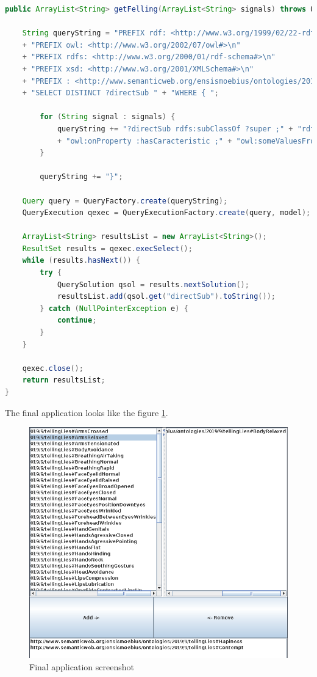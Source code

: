 \documentclass[conference]{IEEEtran}
\begin{document}
\begin{lstlisting}[language=java, caption={Retrieve characteristics}, label={lst:felling}]
	public ArrayList<String> getFelling(ArrayList<String> signals) throws OWLOntologyCreationException {
	
	String queryString = "PREFIX rdf: <http://www.w3.org/1999/02/22-rdf-syntax-ns#>\n"
	+ "PREFIX owl: <http://www.w3.org/2002/07/owl#>\n"
	+ "PREFIX rdfs: <http://www.w3.org/2000/01/rdf-schema#>\n"
	+ "PREFIX xsd: <http://www.w3.org/2001/XMLSchema#>\n"
	+ "PREFIX : <http://www.semanticweb.org/ensismoebius/ontologies/2019/9/tellingLies#>\n"
	+ "SELECT DISTINCT ?directSub " + "WHERE { ";
		
		for (String signal : signals) {
			queryString += "?directSub rdfs:subClassOf ?super ;" + "rdfs:subClassOf [" + "rdf:type owl:Restriction ;"
			+ "owl:onProperty :hasCaracteristic ;" + "owl:someValuesFrom <" + signal + ">] .";
		}
		
		queryString += "}";
	
	Query query = QueryFactory.create(queryString);
	QueryExecution qexec = QueryExecutionFactory.create(query, model);
	
	ArrayList<String> resultsList = new ArrayList<String>();
	ResultSet results = qexec.execSelect();
	while (results.hasNext()) {
		try {
			QuerySolution qsol = results.nextSolution();
			resultsList.add(qsol.get("directSub").toString());
		} catch (NullPointerException e) {
			continue;
		}
	}
	
	qexec.close();
	return resultsList;
}
\end{lstlisting}
The final application looks like the figure \ref{fig:app}.
\begin{figure}[bpht]
	\centering
	\includegraphics[width=1\linewidth]{app}
	\caption{Final application screenshot}
	\label{fig:app}
\end{figure}




\end{document}
